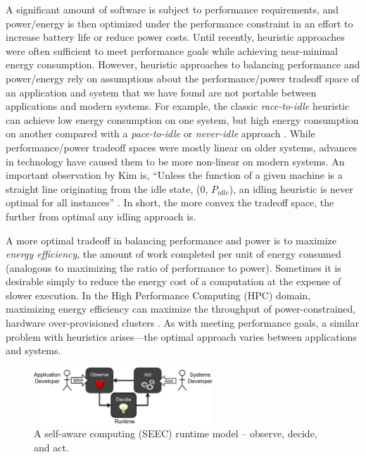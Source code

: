 A significant amount of software is subject to performance requirements, and power/energy is then optimized under the performance constraint in an effort to increase battery life or reduce power costs.
Until recently, heuristic approaches were often sufficient to meet performance goals while achieving near-minimal energy consumption.
However, heuristic approaches to balancing performance and power/energy rely on assumptions about the performance/power tradeoff space of an application and system that we have found are not portable between applications and modern systems.
For example, the classic \emph{race-to-idle} heuristic can achieve low energy consumption on one system, but high energy consumption on another compared with a \emph{pace-to-idle} or \emph{never-idle} approach \cite{Imes2014}.
While performance/power tradeoff spaces were mostly linear on older systems, advances in technology have caused them to be more non-linear on modern systems.
An important observation by Kim \etal is, ``Unless the function of a given machine is a straight line originating from the idle state, (0, $P_{idle}$), an idling heuristic is never optimal for all instances'' \cite{kim-cpsna2015}.
In short, the more convex the tradeoff space, the further from optimal any idling approach is.

A more optimal tradeoff in balancing performance and power is to maximize \emph{energy efficiency}, \ie the amount of work completed per unit of energy consumed (analogous to maximizing the ratio of performance to power).
Sometimes it is desirable simply to reduce the energy cost of a computation at the expense of slower execution.
In the High Performance Computing (HPC) domain, maximizing energy efficiency can maximize the throughput of power-constrained, hardware over-provisioned clusters \cite{PatkiRMAP}.
As with meeting performance goals, a similar problem with heuristics arises---the optimal approach varies between applications and systems.


\begin{figure}[t]
  \begin{centering}
  \includegraphics[width=0.6\textwidth]{figs/SEEC.png}
  \caption{A self-aware computing (SEEC) runtime model -- observe, decide, and act.}
  \label{fig:seec}
  \end{centering}
\end{figure}

